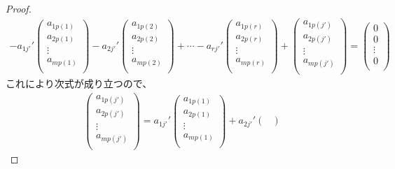 \documentclass[dvipdfmx]{jsarticle}
\begin{document}
\begin{proof}
\begin{align*}
- a_{1j'}'\begin{pmatrix}
a_{1p(1)} \\
a_{2p(1)} \\
 \vdots \\
a_{mp(1)} \\
\end{pmatrix} - a_{2j'}'\begin{pmatrix}
a_{1p(2)} \\
a_{2p(2)} \\
 \vdots \\
a_{mp(2)} \\
\end{pmatrix} + \cdots - a_{rj'}'\begin{pmatrix}
a_{1p(r)} \\
a_{2p(r)} \\
 \vdots \\
a_{mp(r)} \\
\end{pmatrix} + \begin{pmatrix}
a_{1p\left( j' \right)} \\
a_{2p\left( j' \right)} \\
 \vdots \\
a_{mp\left( j' \right)} \\
\end{pmatrix} = \begin{pmatrix}
0 \\
0 \\
 \vdots \\
0 \\
\end{pmatrix}
\end{align*}
これにより次式が成り立つので、
\begin{align*}
\begin{pmatrix}
a_{1p\left( j' \right)} \\
a_{2p\left( j' \right)} \\
 \vdots \\
a_{mp\left( j' \right)} \\
\end{pmatrix} = a_{1j'}'\begin{pmatrix}
a_{1p(1)} \\
a_{2p(1)} \\
 \vdots \\
a_{mp(1)} \\
\end{pmatrix} + a_{2j'}'\begin{pmatrix}

\end{pmatrix}
\end{align*}
\end{proof}
\end{document}
